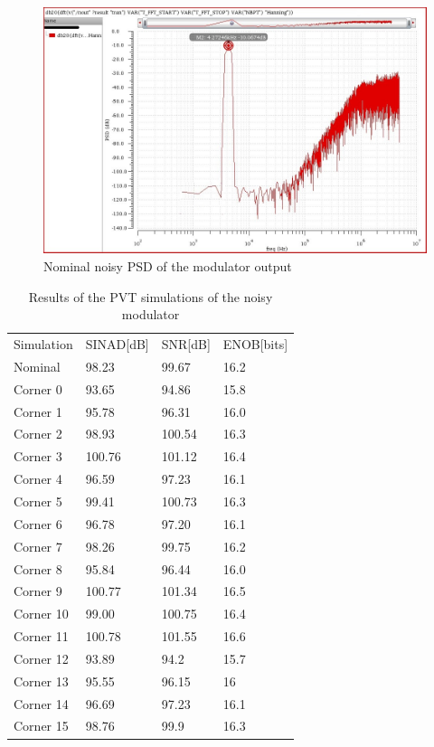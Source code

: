 \begin{figure}[H]
\centering
\includegraphics[width=\textwidth]{images/psd_noise_out.jpg}
\caption{Nominal noisy PSD of the modulator output }
\label{psd_noise_out}
\end{figure}

\begin{table}[H]
\centering

\caption{Results of the PVT simulations of the noisy modulator}
\label{modul_noisy_out}
\begin{tabular}{l|l|l|l}
\hline
\multirow{1}{*}{Simulation} & \multicolumn{1}{c|}{SINAD[dB]} & \multicolumn{1}{c|}{SNR[dB]} & \multicolumn{1}{c}{ENOB[bits]} \\\cline{1-4}
                       
            Nominal      &98.23 & 99.67 & 16.2\\
            Corner 0      &93.65 & 94.86 & 15.8\\
            Corner 1      &95.78 & 96.31 & 16.0\\
            Corner 2      &98.93 & 100.54 & 16.3\\
            Corner 3     &100.76 & 101.12 & 16.4\\
            Corner 4     &96.59 & 97.23 & 16.1\\
            Corner 5      &99.41 & 100.73 & 16.3\\
            Corner 6      &96.78 & 97.20 & 16.1\\
            Corner 7      &98.26 & 99.75 & 16.2\\
            Corner 8      &95.84 & 96.44 & 16.0\\
            Corner 9      &100.77 & 101.34 & 16.5\\
            Corner 10      &99.00 & 100.75 & 16.4\\
            Corner 11      &100.78 & 101.55 & 16.6\\
            Corner 12      &93.89 & 94.2 & 15.7\\
            Corner 13      &95.55 & 96.15 & 16\\
            Corner 14      &96.69 & 97.23 & 16.1\\
            Corner 15      &98.76 & 99.9 & 16.3\\
            
\hline            
\end{tabular}
\end{table}


